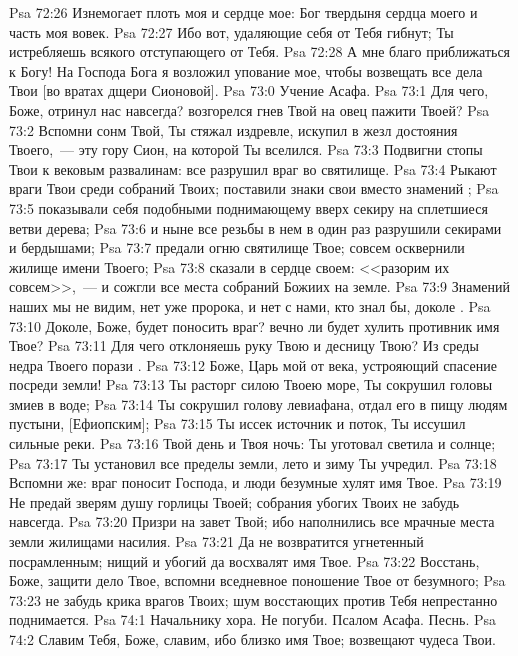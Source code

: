 \vs Psa 72:26 Изнемогает плоть моя и сердце мое: Бог твердыня сердца моего и часть моя вовек.
\vs Psa 72:27 Ибо вот, удаляющие себя от Тебя гибнут; Ты истребляешь всякого отступающего от Тебя.
\vs Psa 72:28 А мне благо приближаться к Богу! На Господа Бога я возложил упование мое, чтобы возвещать все дела Твои [во вратах дщери Сионовой].
\vs Psa 73:0 Учение Асафа.
\rsbpar\vs Psa 73:1 Для чего, Боже, отринул нас навсегда? возгорелся гнев Твой на овец пажити Твоей?
\vs Psa 73:2 Вспомни сонм Твой,  Ты стяжал издревле, искупил в жезл достояния Твоего,~--- эту гору Сион, на которой Ты вселился.
\vs Psa 73:3 Подвигни стопы Твои к вековым развалинам: все разрушил враг во святилище.
\vs Psa 73:4 Рыкают враги Твои среди собраний Твоих; поставили знаки свои вместо знамений ;
\vs Psa 73:5 показывали себя подобными поднимающему вверх секиру на сплетшиеся ветви дерева;
\vs Psa 73:6 и ныне все резьбы в нем в один раз разрушили секирами и бердышами;
\vs Psa 73:7 предали огню святилище Твое; совсем осквернили жилище имени Твоего;
\vs Psa 73:8 сказали в сердце своем: <<разорим их совсем>>,~--- и сожгли все места собраний Божиих на земле.
\vs Psa 73:9 Знамений наших мы не видим, нет уже пророка, и нет с нами, кто знал бы, доколе .
\vs Psa 73:10 Доколе, Боже, будет поносить враг? вечно ли будет хулить противник имя Твое?
\vs Psa 73:11 Для чего отклоняешь руку Твою и десницу Твою? Из среды недра Твоего порази .
\vs Psa 73:12 Боже, Царь мой от века, устрояющий спасение посреди земли!
\vs Psa 73:13 Ты расторг силою Твоею море, Ты сокрушил головы змиев в воде;
\vs Psa 73:14 Ты сокрушил голову левиафана, отдал его в пищу людям пустыни, [Ефиопским];
\vs Psa 73:15 Ты иссек источник и поток, Ты иссушил сильные реки.
\vs Psa 73:16 Твой день и Твоя ночь: Ты уготовал светила и солнце;
\vs Psa 73:17 Ты установил все пределы земли, лето и зиму Ты учредил.
\vs Psa 73:18 Вспомни же: враг поносит Господа, и люди безумные хулят имя Твое.
\vs Psa 73:19 Не предай зверям душу горлицы Твоей; собрания убогих Твоих не забудь навсегда.
\vs Psa 73:20 Призри на завет Твой; ибо наполнились все мрачные места земли жилищами насилия.
\vs Psa 73:21 Да не возвратится угнетенный посрамленным; нищий и убогий да восхвалят имя Твое.
\vs Psa 73:22 Восстань, Боже, защити дело Твое, вспомни вседневное поношение Твое от безумного;
\vs Psa 73:23 не забудь крика врагов Твоих; шум восстающих против Тебя непрестанно поднимается.
\vs Psa 74:1 Начальнику хора. Не погуби. Псалом Асафа. Песнь.
\rsbpar\vs Psa 74:2 Славим Тебя, Боже, славим, ибо близко имя Твое; возвещают чудеса Твои.
